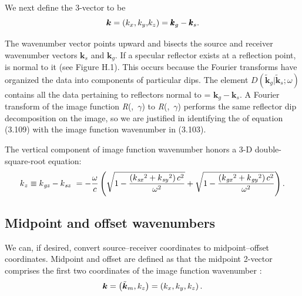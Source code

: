 We next define the 3-vector  to be
\begin{equation}{\boldsymbol{k}}=\left(\text{\textit{$k_x$}},\text{\textit{$k_y$}}\text{\textit{$,$}}\text{\textit{$k_z$}}\right)=\text{\textit{$\pmb{\text{\textit{$k$}}}_g-\pmb{\text{\textit{$k$}}}_s.$}}\end{equation}

The wavenumber vector  points upward and bisects the source and receiver wavenumber vectors \(\boldsymbol{k}_s\) and \(\boldsymbol{k}_g\). {
}If a specular reflector exists at a reflection point,  is normal to it (see Figure H.1). This occurs because the Fourier transforms
have organized the data into components of particular dips. The element \(D\left(\tilde{\boldsymbol{k}}_g|\tilde{\boldsymbol{k}}_s;\omega
\right)\) contains all the data pertaining to reflectors normal to  = \(\boldsymbol{k}_g-\boldsymbol{k}_s\). A Fourier transform of the image
function \textit{R}(,\, $\gamma $) to \textit{R}(,\, $\gamma $) performs the same reflector dip decomposition on
the image, so we are justified in identifying the  of equation (3.109) with the image function wavenumber in (3.103).

The vertical component of image function wavenumber honors a 3-D double-square-root equation:
\begin{equation}\text{\textit{$k$}}_{\text{\textit{$z$}}}\equiv \text{\textit{$k$}}_{\text{\textit{gz}}}-\text{\textit{$k$}}_{\text{\textit{sz}}}\text{
 }=- \frac{\omega }{\text{\textit{$c$}}} \left( \sqrt{1-\frac{\left(\text{\textit{$k$}}_{\text{\textit{sx}}}{}^2+\text{\textit{$k$}}_{\text{\textit{sy}}}{}^2\right)\text{\textit{$c$}}^2}{\omega
^2}} +\sqrt{1-\frac{\left(\text{\textit{$k$}}_{\text{\textit{gx}}}{}^2+\text{\textit{$k$}}_{\text{\textit{gy}}}{}^2\right)\text{\textit{$c$}}^2}{\omega
^2}}\right).\end{equation}

\subsection{Midpoint and offset wavenumbers}

We can, if desired, convert source--receiver coordinates to midpoint--offset coordinates. Midpoint and offset are defined as that the midpoint 2-vector comprises the first two coordinates of the image function wavenumber \!:
\begin{equation}{\boldsymbol{k}}=\left(\tilde{\boldsymbol{k}}_m,\text{\textit{$k_z$}}\right)=\left(\text{\textit{$k_x$}},\text{\textit{$k_y$}},\text{\textit{$k_z$}}\right).\end{equation}

